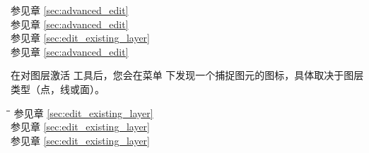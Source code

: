 \begin{itemize}
\begin{tabbing}
        \>
        \> 参见章 \ref{sec:advanced_edit}
        \>  \\
        \>
        \> 参见章 \ref{sec:advanced_edit}
        \>  \\
        \>
        \> 参见章 \ref{sec:edit_existing_layer}
        \>  \\
        \>
        \> 参见章 \ref{sec:advanced_edit}
        \>  \\
\end{tabbing}

在对图层激活  工具后，您会在菜单  下发现一个捕捉图元的图标，具体取决于图层类型（点，线或面）。\\

\begin{tabbing}
\hspace{4.5cm}\=\hspace{3cm}\=\hspace{3.5cm}\= \kill
{}
        \>
        \> 参见章 \ref{sec:edit_existing_layer}
        \>  \\
        \>
        \> 参见章 \ref{sec:edit_existing_layer}
        \>  \\
        \>
        \> 参见章 \ref{sec:edit_existing_layer}
        \>  \\
\end{tabbing}



\end{itemize}
